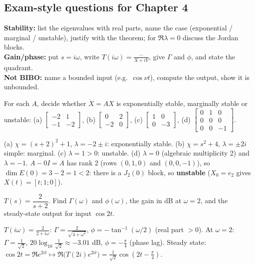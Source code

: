 \subsection{Exam-style questions for Chapter 4}\label{ss:4-7}
\begin{answerbox}
\textbf{Stability:} list the eigenvalues with real parts, name the case (exponential / marginal / unstable), justify with the theorem; for $\Re\lambda=0$ discuss the Jordan blocks.\\
\textbf{Gain/phase:} put $s=i\omega$, write $T(i\omega)=\frac{\cdots}{X+iY}$, give $\Gamma$ and $\phi$, and state the quadrant.\\
\textbf{Not BIBO:} name a bounded input (e.g.\ $\cos\nu t$), compute the output, show it is unbounded.
\end{answerbox}
\begin{qbox}[title={Q4.1 (classification)}]
For each $A$, decide whether $\dot X=AX$ is exponentially stable, marginally stable or unstable:
(a) $\begin{bmatrix}-2&1\\-1&-2\end{bmatrix}$, (b) $\begin{bmatrix}0&2\\-2&0\end{bmatrix}$, (c) $\begin{bmatrix}1&0\\0&-3\end{bmatrix}$, (d) $\begin{bmatrix}0&1&0\\0&0&0\\0&0&-1\end{bmatrix}$.
\end{qbox}
\begin{solbox}
(a) $\chi=(s+2)^2+1$, $\lambda=-2\pm i$: exponentially stable. (b) $\chi=s^2+4$, $\lambda=\pm2i$ simple: marginal. (c) $\lambda=1>0$: unstable.
(d) $\lambda=0$ (algebraic multiplicity 2) and $\lambda=-1$. $A-0I=A$ has rank 2 (rows $(0,1,0)$ and $(0,0,-1)$), so $\dim E(0)=3-2=1<2$: there is a $J_2(0)$ block, so \textbf{unstable} ($X_0=e_2$ gives $X(t)=[t;1;0]$).
\end{solbox}

\begin{qbox}[title={Q4.2 (gain and phase)}]
$T(s)=\dfrac{2}{s+2}$. Find $\Gamma(\omega)$ and $\phi(\omega)$, the gain in dB at $\omega=2$, and the steady-state output for input $\cos2t$.
\end{qbox}
\begin{solbox}
$T(i\omega)=\frac{2}{2+i\omega}$: $\Gamma=\frac{2}{\sqrt{4+\omega^2}}$, $\phi=-\tan^{-1}(\omega/2)$ (real part $>0$). At $\omega=2$: $\Gamma=\frac1{\sqrt2}$, $20\log_{10}\frac1{\sqrt2}\approx-3.01$ dB, $\phi=-\frac\pi4$ (phase lag).
Steady state: $\cos2t=\Re e^{2it}\mapsto\Re\big(T(2i)e^{2it}\big)=\frac1{\sqrt2}\cos(2t-\frac\pi4)$.
\end{solbox}

